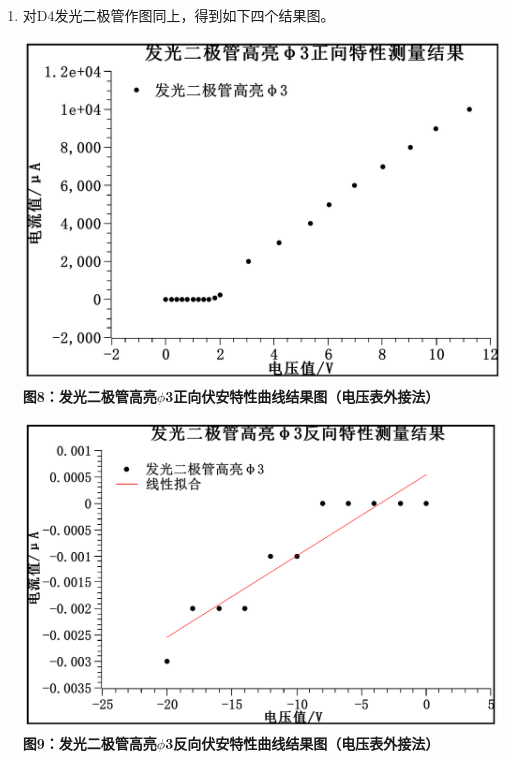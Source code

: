 \documentclass[a4paper]{article}
\begin{document}
\begin{enumerate}
    \newpage
    \item 对D4发光二极管作图同上，得到如下四个结果图。
    \begin{center}
        \includegraphics[width=\textwidth-40mm]{008}\\ 
        \bfseries{}\songti 图8：发光二极管高亮$\phi$3正向伏安特性曲线结果图（电压表外接法）
    \end{center}
    \begin{center}
        \includegraphics[width=\textwidth-40mm]{009}\\ 
        \bfseries{}\songti 图9：发光二极管高亮$\phi$3反向伏安特性曲线结果图（电压表外接法）
    \end{center}
    \begin{center}

\end{center}
\end{enumerate}
\end{document}
